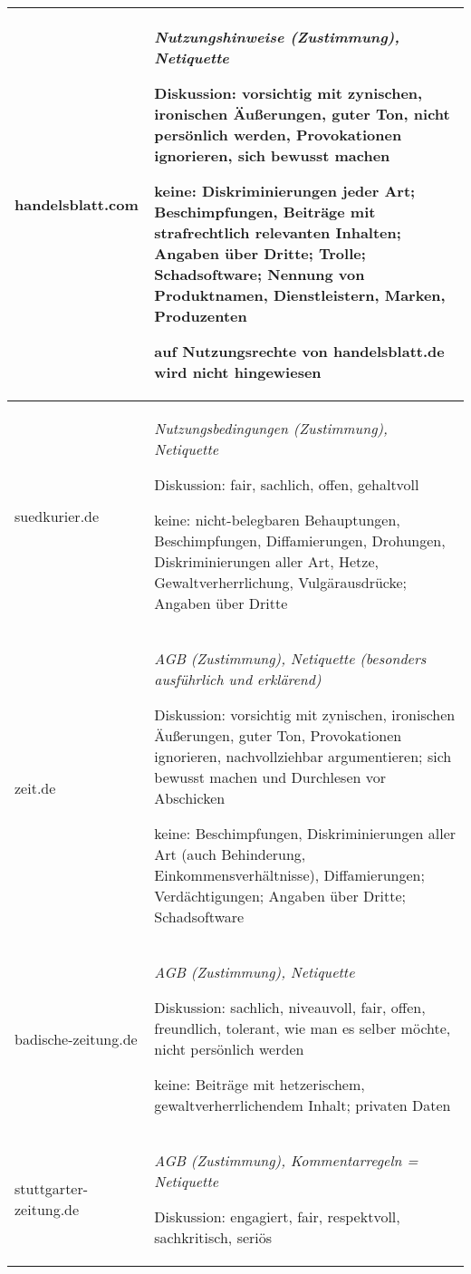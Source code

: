\begin{longtable}{p{28mm}p{110mm}}
handelsblatt.com & \emph{Nutzungshinweise (Zustimmung), Netiquette}

  Diskussion: vorsichtig mit zynischen, ironischen Äußerungen, guter Ton, nicht
  persönlich werden, Provokationen ignorieren, sich bewusst machen

  keine: Diskriminierungen jeder Art;  Beschimpfungen, Beiträge mit
  strafrechtlich relevanten Inhalten; Angaben über Dritte;
  Trolle; Schadsoftware; Nennung von Produktnamen, Dienstleistern, Marken,
  Produzenten

  auf Nutzungsrechte von handelsblatt.de wird nicht
  hingewiesen\\*\midrule

suedkurier.de & \emph{Nutzungsbedingungen (Zustimmung), Netiquette}

  Diskussion: fair, sachlich, offen, gehaltvoll

  keine: nicht-belegbaren Behauptungen, Beschimpfungen, Diffamierungen,
  Drohungen, Diskriminierungen aller Art, Hetze, Gewaltverherrlichung,
  Vulgärausdrücke;  Angaben über Dritte
  \\*\midrule

zeit.de & \emph{AGB (Zustimmung), Netiquette (besonders ausführlich und erklärend)}

  Diskussion: vorsichtig mit zynischen, ironischen Äußerungen, guter Ton,
  Provokationen ignorieren, nachvollziehbar argumentieren; sich bewusst machen
  und Durchlesen vor Abschicken

  keine: Beschimpfungen, Diskriminierungen aller Art (auch Behinderung,
  Einkommensverhältnisse), Diffamierungen; Verdächtigungen; Angaben über Dritte;
  Schadsoftware
  \\*\midrule

badische-zeitung.de & \emph{AGB (Zustimmung), Netiquette}

  Diskussion: sachlich, niveauvoll, fair, offen, freundlich, tolerant, wie man
  es selber möchte, nicht persönlich werden

  keine: Beiträge mit hetzerischem, gewaltverherrlichendem Inhalt; privaten
  Daten
  \\*\midrule

stuttgarter-zeitung.de & \emph{AGB (Zustimmung), Kommentarregeln = Netiquette}

  Diskussion: engagiert, fair, respektvoll, sachkritisch, seriös


\end{longtable}
